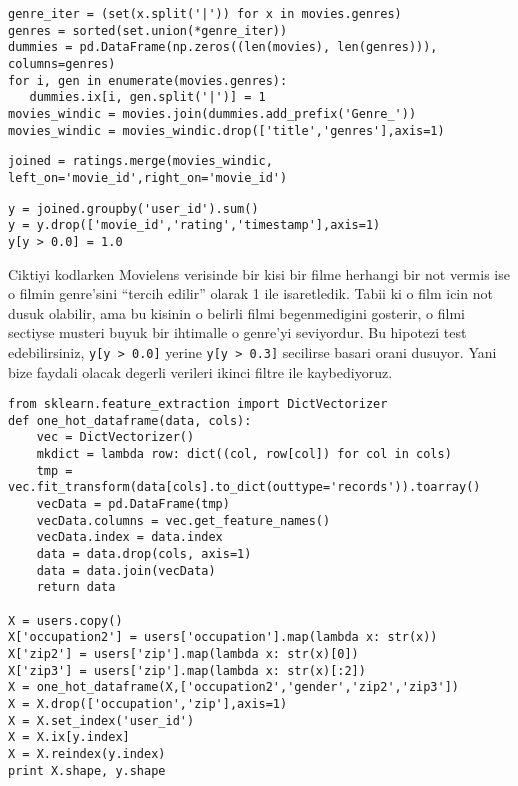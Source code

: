\documentclass[12pt,fleqn]{article}\usepackage{../common}
\begin{document}
\begin{verbatim}
genre_iter = (set(x.split('|')) for x in movies.genres)
genres = sorted(set.union(*genre_iter))
dummies = pd.DataFrame(np.zeros((len(movies), len(genres))), columns=genres)
for i, gen in enumerate(movies.genres):
   dummies.ix[i, gen.split('|')] = 1
movies_windic = movies.join(dummies.add_prefix('Genre_'))
movies_windic = movies_windic.drop(['title','genres'],axis=1)
\end{verbatim}

\begin{verbatim}
joined = ratings.merge(movies_windic, left_on='movie_id',right_on='movie_id')
\end{verbatim}

\begin{verbatim}
y = joined.groupby('user_id').sum()
y = y.drop(['movie_id','rating','timestamp'],axis=1)
y[y > 0.0] = 1.0
\end{verbatim}

Ciktiyi kodlarken Movielens verisinde bir kisi bir filme herhangi bir not
vermis ise o filmin genre'sini ``tercih edilir'' olarak 1 ile
isaretledik. Tabii ki o film icin not dusuk olabilir, ama bu kisinin o
belirli filmi begenmedigini gosterir, o filmi sectiyse musteri buyuk bir
ihtimalle o genre'yi seviyordur. Bu hipotezi test edebilirsiniz,
\verb!y[y > 0.0]!  yerine \verb!y[y > 0.3]!  secilirse basari orani
dusuyor. Yani bize faydali olacak degerli verileri ikinci filtre ile
kaybediyoruz.

\begin{verbatim}
from sklearn.feature_extraction import DictVectorizer
def one_hot_dataframe(data, cols):
    vec = DictVectorizer()
    mkdict = lambda row: dict((col, row[col]) for col in cols)
    tmp = vec.fit_transform(data[cols].to_dict(outtype='records')).toarray()
    vecData = pd.DataFrame(tmp)
    vecData.columns = vec.get_feature_names()
    vecData.index = data.index
    data = data.drop(cols, axis=1)
    data = data.join(vecData)
    return data

X = users.copy()
X['occupation2'] = users['occupation'].map(lambda x: str(x))
X['zip2'] = users['zip'].map(lambda x: str(x)[0])
X['zip3'] = users['zip'].map(lambda x: str(x)[:2])
X = one_hot_dataframe(X,['occupation2','gender','zip2','zip3'])
X = X.drop(['occupation','zip'],axis=1)
X = X.set_index('user_id')
X = X.ix[y.index]
X = X.reindex(y.index)
print X.shape, y.shape
\end{verbatim}
\end{document}
